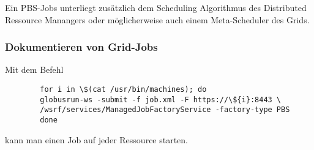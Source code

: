 		Ein PBS-Jobs unterliegt zusätzlich dem Scheduling Algorithmus des
		Distributed Ressource Manangers %
		oder möglicherweise auch einem Meta-Scheduler des Grids.
	
	\subsubsection{Dokumentieren von Grid-Jobs}
		Mit dem Befehl
		\begin{verbatim}
		for i in \$(cat /usr/bin/machines); do 
		globusrun-ws -submit -f job.xml -F https://\${i}:8443 \
		/wsrf/services/ManagedJobFactoryService -factory-type PBS 
		done
		\end{verbatim}
		kann man einen Job auf jeder Ressource starten.

	
		

